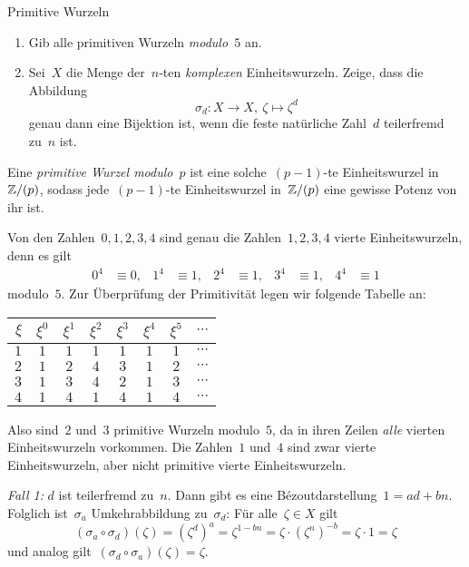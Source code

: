 \documentclass{algblatt}
\begin{document}
\ifloesungen\newpage\fi
\begin{aufgabe}{Primitive Wurzeln}
\begin{enumerate}
\item Gib alle primitiven Wurzeln \emph{modulo~$5$} an.

\item Sei~$X$ die Menge der~$n$-ten \emph{komplexen} Einheitswurzeln. Zeige, dass die
Abbildung
\[ \sigma_d : X \longrightarrow X,\ \zeta \longmapsto \zeta^d \]
genau dann eine Bijektion ist, wenn die feste natürliche Zahl~$d$ teilerfremd
zu~$n$ ist.
\end{enumerate}

\begin{loesungE}
\item Eine \emph{primitive Wurzel modulo~$p$} ist eine solche~$(p-1)$-te
Einheitswurzel in~$\mathbb{Z}/(p)$, sodass jede~$(p-1)$-te Einheitswurzel in~$\mathbb{Z}/(p)$
eine gewisse Potenz von ihr ist.

Von den Zahlen~$0,1,2,3,4$ sind genau die Zahlen~$1,2,3,4$ vierte
Einheitswurzeln, denn es gilt
\begin{align*}
  0^4 &\equiv 0, & 1^4 &\equiv 1, & 2^4 &\equiv 1, & 3^4 &\equiv 1, &
  4^4 &\equiv 1
\end{align*}
modulo~$5$. Zur Überprüfung der Primitivität legen wir folgende Tabelle an:
\begin{center}
  \begin{tabular}{r|c|c|c|c|c|c|c}
    $\xi$ & $\xi^0$ & $\xi^1$ & $\xi^2$ & $\xi^3$ & $\xi^4$ & $\xi^5$ & $\cdots$ \\\hline
    $1$ & $1$ & $1$ & $1$ & $1$ & $1$ & $1$ & $\cdots$ \\
    $2$ & $1$ & $2$ & $4$ & $3$ & $1$ & $2$ & $\cdots$ \\
    $3$ & $1$ & $3$ & $4$ & $2$ & $1$ & $3$ & $\cdots$ \\
    $4$ & $1$ & $4$ & $1$ & $4$ & $1$ & $4$ & $\cdots$
  \end{tabular}
\end{center}
Also sind~$2$ und~$3$ primitive Wurzeln modulo~$5$, da in ihren Zeilen
\emph{alle} vierten Einheitswurzeln vorkommen. Die Zahlen~$1$ und~$4$ sind zwar
vierte Einheitswurzeln, aber nicht primitive vierte Einheitswurzeln.

\item \emph{Fall 1:} $d$ ist teilerfremd zu~$n$. Dann gibt es eine
Bézoutdarstellung~$1 = ad + bn$. Folglich ist~$\sigma_a$ Umkehrabbildung
zu~$\sigma_d$: Für alle~$\zeta \in X$ gilt
\[ (\sigma_a \circ \sigma_d)(\zeta) =
  (\zeta^d)^a = \zeta^{1 - bn} = \zeta \cdot (\zeta^n)^{-b} = \zeta \cdot 1 =
  \zeta \]
und analog gilt~$(\sigma_d \circ \sigma_a)(\zeta) = \zeta$.


\end{loesungE}
\end{aufgabe}
\end{document}
